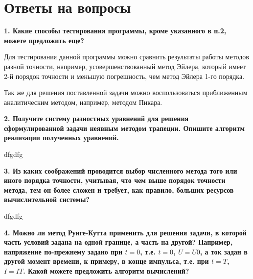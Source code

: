 \chapter{Ответы на вопросы}


\hspace{0cm} \textbf{1. Какие способы тестирования программы, кроме указанного в п.2, можете предложить еще?}

Для тестирования данной программы можно сравнить результаты работы методов разной точности, например, усовершенствованный метод Эйлера, который имеет 2-й порядок точности и меньшую погрешность, чем метод Эйлера 1-го порядка.

Так же для решения поставленной задачи можно воспользоваться приближенным аналитическим методом, например, методом Пикара.
\bigskip\bigskip\bigskip

\hspace{0cm} \textbf{2. Получите систему разностных уравнений для решения сформулированной задачи неявным методом трапеции. Опишите алгоритм реализации полученных уравнений.}

dfgdfg
\bigskip\bigskip\bigskip

\hspace{0cm} \textbf{3. Из каких соображений проводится выбор численного метода того или иного порядка точности, учитывая, что чем выше порядок точности метода, тем он более сложен и требует, как правило, больших ресурсов вычислительной системы?}

dfgdfg
\bigskip\bigskip\bigskip

\hspace{0cm} \textbf{4. Можно ли метод Рунге-Кутта применить для решения задачи, в которой часть условий задана на одной границе, а часть на другой? Например, напряжение по-прежнему задано при $t = 0$, т.е. $t = 0$, $U = U0$, а ток задан в другой момент времени, к примеру, в конце импульса, т.е. при $t = T $, $I = IT $. Какой можете предложить алгоритм вычислений?}

